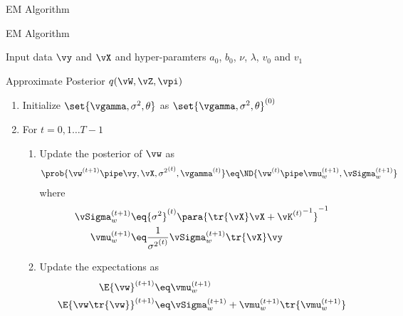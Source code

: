 \documentclass{article}
\begin{document}
\begin{question}
\begin{qsection}{EM Algorithm}
		\begin{algo}[0.9\textwidth]{EM Algorithm}

			\newcommand{\sss}[1]{{\sigma^2}^{(#1)}}
			\newcommand{\sgd}[1]{{\gamma_d}^{(#1)}}
			\newcommand{\svg}[1]{{\vgamma}^{(#1)}}

			 Input data $\vy$ and $\vX$ and hyper-paramters $a_0$, $b_0$, $\nu$, $\lambda$, $v_0$ and $v_1$ \sbr

			 Approximate Posterior $q(\vW, \vZ, \vpi)$ \sbr

			\begin{enumerate}
				\item Initialize $\set{\vgamma, \sigma^2, \theta}$ as $\set{\vgamma, \sigma^2, \theta}^{(0)}$
				\item For $t = 0, 1 \dots T - 1$
					\begin{enumerate}
						\item Update the posterior of $\vw$ as
							\begin{align*}
								\prob{\vw^{(t + 1)} \pipe \vy, \vX, \sss{t}, \svg{t}}	\eq	\ND{\vw^{(t)} \pipe \vmu_{w}^{(t + 1)}, \vSigma_{w}^{(t + 1)}}
							\end{align*}
							where
							\begin{align*}
								\vSigma_w^{(t + 1)}	&\eq	\sss{t} \para{\tr{\vX} \vX + {\vK^{(t)}}^{-1}}^{-1} \\
								\vmu_w^{(t + 1)}		&\eq	\frac{1}{\sss{t}}	\vSigma_w^{(t + 1)} \tr{\vX} \vy
							\end{align*}

						\item Update the expectations as
							\begin{align*}
								\E{\vw}^{(t + 1)}			&\eq	\vmu_w^{(t + 1)} \\
								\E{\vw \tr{\vw}}^{(t + 1)}	&\eq	\vSigma_w^{(t + 1)} + \vmu_w^{(t + 1)} \tr{\vmu_w^{(t + 1)}}
							\end{align*}


\end{enumerate}
\end{enumerate}
\end{algo}
\end{qsection}
\end{question}
\end{document}
